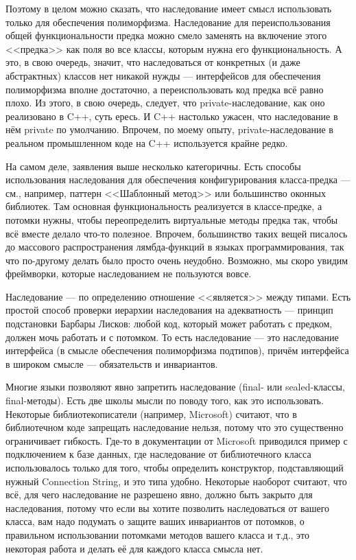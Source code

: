 \documentclass[a5paper]{article}
\begin{document}
Поэтому в целом можно сказать, что наследование имеет смысл использовать только для обеспечения полиморфизма. Наследование для переиспользования общей функциональности предка можно смело заменять на включение этого <<предка>> как поля во все классы, которым нужна его функциональность. А это, в свою очередь, значит, что наследоваться от конкретных (и даже абстрактных) классов нет никакой нужды --- интерфейсов для обеспечения полиморфизма вполне достаточно, а переиспользовать код предка всё равно плохо. Из этого, в свою очередь, следует, что private-наследование, как оно реализовано в C++, суть ересь. И C++ настолько ужасен, что наследование в нём private по умолчанию. Впрочем, по моему опыту, private-наследование в реальном промышленном коде на C++ используется крайне редко.

На самом деле, заявления выше несколько категоричны. Есть способы использования наследования для обеспечения конфигурирования класса-предка --- см., например, паттерн <<Шаблонный метод>> или большинство оконных библиотек. Там основная функциональность реализуется в классе-предке, а потомки нужны, чтобы переопределить виртуальные методы предка так, чтобы всё вместе делало что-то полезное. Впрочем, большинство таких вещей писалось до массового распространения лямбда-функций в языках программирования, так что по-другому делать было просто очень неудобно. Возможно, мы скоро увидим фреймворки, которые наследованием не пользуются вовсе.

Наследование --- по определению отношение <<является>> между типами. Есть простой способ проверки иерархии наследования на адекватность --- принцип подстановки Барбары Лисков: любой код, который может работать с предком, должен мочь работать и с потомком. То есть наследование --- это наследование интерфейса (в смысле обеспечения полиморфизма подтипов), причём интерфейса в широком смысле --- обязательств и инвариантов.

Многие языки позволяют явно запретить наследование (final- или sealed-классы, final-методы). Есть две школы мысли по поводу того, как это использовать. Некоторые библиотекописатели (например, Microsoft) считают, что в библиотечном коде запрещать наследование нельзя, потому что это существенно ограничивает гибкость. Где-то в документации от Microsoft приводился пример с подключением к базе данных, где наследование от библиотечного класса использовалось только для того, чтобы определить конструктор, подставляющий нужный Connection String, и это типа удобно. Некоторые наоборот считают, что всё, для чего наследование не разрешено явно, должно быть закрыто для наследования, потому что если вы хотите позволить наследоваться от вашего класса, вам надо подумать о защите ваших инвариантов от потомков, о правильном использовании потомками методов вашего класса и т.д., это некоторая работа и делать её для каждого класса смысла нет.
\end{document}
